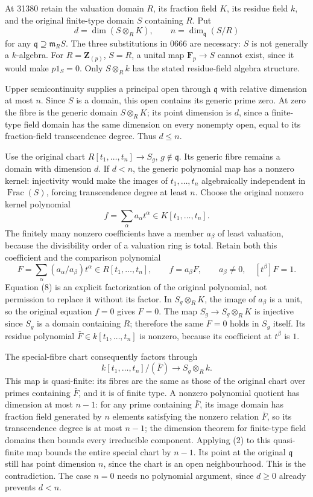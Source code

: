 At 31380 retain the valuation domain \(R\), its fraction field \(K\), its residue field \(k\), and the original finite-type domain \(S\) containing \(R\). Put \[
 d=\dim(S\otimes_R K),\qquad
 n=\dim_{\mathfrak q}(S/R)
\] for any \(\mathfrak q\supseteq\mathfrak m_R S\). The three substitutions in 0666 are necessary: \(S\) is not generally a \(k\)-algebra. For \(R=\mathbf Z_{(p)}\), \(S=R\), a unital map \(\mathbf F_p\to S\) cannot exist, since it would make \(p1_S=0\). Only \(S\otimes_R k\) has the stated residue-field algebra structure.

Upper semicontinuity supplies a principal open through \(\mathfrak q\) with relative dimension at most \(n\). Since \(S\) is a domain, this open contains its generic prime zero. At zero the fibre is the generic domain \(S\otimes_R K\); its point dimension is \(d\), since a finite-type field domain has the same dimension on every nonempty open, equal to its fraction-field transcendence degree. Thus \(d\leq n\).

Use the original chart \(R[t_1,\ldots,t_n]\to S_g\), \(g\notin\mathfrak q\). Its generic fibre remains a domain with dimension \(d\). If \(d<n\), the generic polynomial map has a nonzero kernel: injectivity would make the images of \(t_1,\ldots,t_n\) algebraically independent in \(\operatorname{Frac}(S)\), forcing transcendence degree at least \(n\). Choose the original nonzero kernel polynomial \[
 f=\sum_{\alpha}a_\alpha t^\alpha\in K[t_1,\ldots,t_n].
\] The finitely many nonzero coefficients have a member \(a_\beta\) of least valuation, because the divisibility order of a valuation ring is total. Retain both this coefficient and the comparison polynomial \[
 F=\sum_\alpha (a_\alpha/a_\beta)t^\alpha\in R[t_1,\ldots,t_n],
 \qquad f=a_\beta F,\qquad
 a_\beta\ne0,\quad [t^\beta]F=1.
 \tag{8}
\] Equation (8) is an explicit factorization of the original polynomial, not permission to replace it without its factor. In \(S_g\otimes_R K\), the image of \(a_\beta\) is a unit, so the original equation \(f=0\) gives \(F=0\). The map \(S_g\to S_g\otimes_R K\) is injective since \(S_g\) is a domain containing \(R\); therefore the same \(F=0\) holds in \(S_g\) itself. Its residue polynomial \(\bar F\in k[t_1,\ldots,t_n]\) is nonzero, because its coefficient at \(t^\beta\) is \(1\).

The special-fibre chart consequently factors through \[
 k[t_1,\ldots,t_n]/(\bar F)\longrightarrow S_g\otimes_R k.
\] This map is quasi-finite: its fibres are the same as those of the original chart over primes containing \(\bar F\), and it is of finite type. A nonzero polynomial quotient has dimension at most \(n-1\): for any prime containing \(\bar F\), its image domain has fraction field generated by \(n\) elements satisfying the nonzero relation \(\bar F\), so its transcendence degree is at most \(n-1\); the dimension theorem for finite-type field domains then bounds every irreducible component. Applying (2) to this quasi-finite map bounds the entire special chart by \(n-1\). Its point at the original \(\mathfrak q\) still has point dimension \(n\), since the chart is an open neighbourhood. This is the contradiction. The case \(n=0\) needs no polynomial argument, since \(d\geq0\) already prevents \(d<n\).

